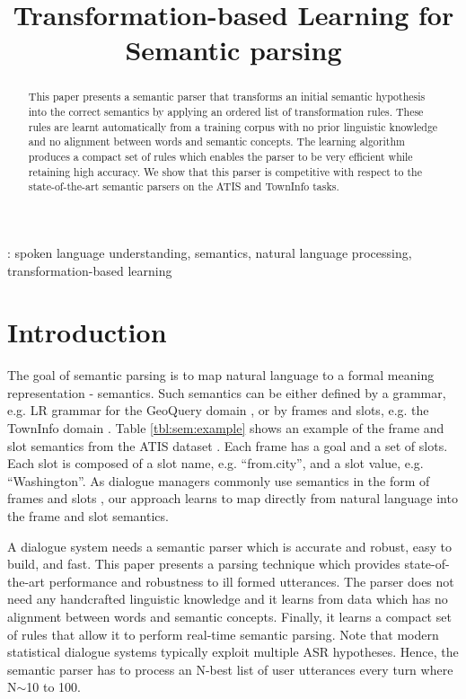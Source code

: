 \documentclass{article}
\title{Transformation-based Learning for Semantic parsing}
\begin{document}
\maketitle
%
\begin{abstract}
This paper presents a semantic parser that transforms an initial semantic hypothesis into the correct semantics by applying an ordered list of transformation rules. These rules are learnt automatically from a training corpus with no prior linguistic knowledge and no alignment between words and semantic concepts. The learning algorithm produces a compact set of rules which enables the parser to be very efficient while retaining high accuracy. We show that this parser is competitive with respect to the state-of-the-art semantic parsers on the ATIS and TownInfo tasks.
\end{abstract}
\vspace{0.1cm}
: spoken language understanding, semantics, natural language processing, transformation-based learning


\section{Introduction}
The goal of semantic parsing is to map natural language to a formal meaning representation - semantics. Such semantics can be either defined by a grammar, e.g. LR grammar for the GeoQuery domain \cite{kate05}, or by frames and slots, e.g. the TownInfo domain \cite{mairesse09}. Table \ref{tbl:sem:example} shows an example of the frame and slot semantics from the ATIS dataset \cite{atis94}. Each frame has a goal and a set of slots. Each slot is composed of a slot name, e.g. ``from.city'',
and a slot value, e.g. ``Washington''. As dialogue managers commonly use semantics in the form of frames and slots \cite{williams07,thomson08}, our approach learns to map directly from natural language into the frame and slot semantics.


A dialogue system needs a semantic parser which is accurate and robust, easy to build, and fast. This paper presents a parsing technique which provides state-of-the-art performance and robustness to ill formed utterances. The parser does not need any handcrafted linguistic knowledge and it learns from data which has no alignment between words and semantic concepts. Finally, it learns a compact set of rules that allow it to perform real-time semantic parsing. Note that modern statistical dialogue systems typically exploit multiple ASR hypotheses. Hence, the semantic parser has to process an N-best list of user utterances every turn where N$\sim$10 to 100.
\end{document}
